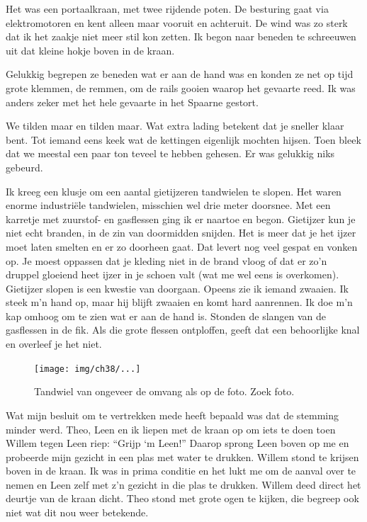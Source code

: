 \documentclass[10pt,twoside, openright]{memoir}
\begin{document}
Het was een portaalkraan, met twee rijdende poten. De besturing gaat via elektromotoren en kent alleen maar vooruit en achteruit. De wind was zo sterk dat ik het zaakje niet meer stil kon zetten. Ik begon naar beneden te schreeuwen uit dat kleine hokje boven in de kraan. 

Gelukkig begrepen ze beneden wat er aan de hand was en konden ze net op tijd grote klemmen, de remmen, om de rails gooien waarop het gevaarte reed. Ik was anders zeker met het hele gevaarte in het Spaarne gestort.

We tilden maar en tilden maar. Wat extra lading betekent dat je sneller klaar bent. Tot iemand eens keek wat de kettingen eigenlijk mochten hijsen. Toen bleek dat we meestal een paar ton teveel te hebben gehesen. Er was gelukkig niks gebeurd.

Ik kreeg een klusje om een aantal gietijzeren tandwielen te slopen. Het waren enorme industriële tandwielen, misschien wel drie meter doorsnee. Met een karretje met zuurstof- en gasflessen ging ik er naartoe en begon. Gietijzer kun je niet echt branden, in de zin van doormidden snijden. Het is meer dat je het ijzer moet laten smelten en er zo doorheen gaat. Dat levert nog veel gespat en vonken op. Je moest oppassen dat je kleding niet in de brand vloog of dat er zo’n druppel gloeiend heet ijzer in je schoen valt (wat me wel eens is overkomen). Gietijzer slopen is een kwestie van doorgaan. Opeens zie ik iemand zwaaien. Ik steek m’n hand op, maar hij blijft zwaaien en komt hard aanrennen. Ik doe m’n kap omhoog om te zien wat er aan de hand is. Stonden de slangen van de gasflessen in de fik. Als die grote flessen ontploffen, geeft dat een behoorlijke knal en overleef je het niet. 

\begin{figure}
\texttt{[image: img/ch38/...]}
\caption*{\footnotesize Tandwiel van ongeveer de omvang als op de foto. Zoek foto.}
\end{figure}

Wat mijn besluit om te vertrekken mede heeft bepaald was dat de stemming minder werd. Theo, Leen en ik liepen met de kraan op om iets te doen toen Willem tegen Leen riep: ``Grijp ‘m Leen!'' Daarop sprong Leen boven op me en probeerde mijn gezicht in een plas met water te drukken. Willem stond te krijsen boven in de kraan. Ik was in prima conditie en het lukt me om de aanval  over te nemen en Leen zelf met z’n gezicht in die plas te drukken. Willem deed direct het deurtje van de kraan dicht. Theo stond met grote ogen te kijken, die begreep ook niet wat dit nou weer betekende.
\end{document}
